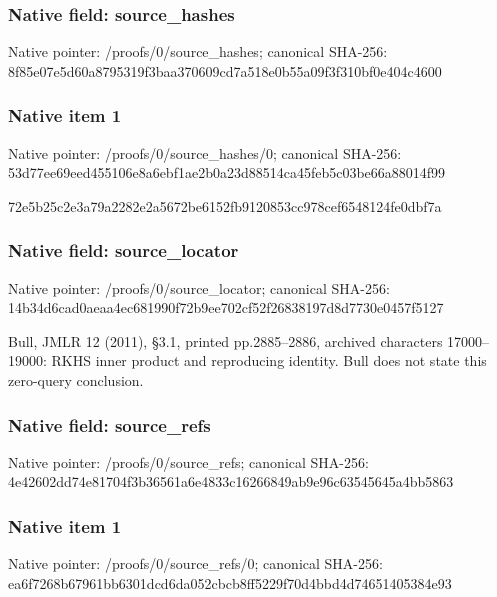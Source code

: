 \documentclass[10pt,a4paper]{article}
\begin{document}
\subsubsection{Native field: source\_\allowbreak{}hashes}
Native pointer: /proofs/0/source\_\allowbreak{}hashes; canonical SHA-256: 8f85e07e5d60a8795319f3baa370609cd7a518e0b55a09f3f310bf0e404c4600

\subsubsection{Native item 1}
Native pointer: /proofs/0/source\_\allowbreak{}hashes/0; canonical SHA-256: 53d77ee69eed455106e8a6ebf1ae2b0a23d88514ca45feb5c03be66a88014f99

\begingroup\raggedright\sloppy 72e5b25c2e3a79a2282e2a5672be6152fb9120853cc978cef6548124fe0dbf7a\par\endgroup

\subsubsection{Native field: source\_\allowbreak{}locator}
Native pointer: /proofs/0/source\_\allowbreak{}locator; canonical SHA-256: 14b34d6cad0aeaa4ec681990f72b9ee702cf52f26838197d8d7730e0457f5127

\begingroup\raggedright\sloppy Bull,\allowbreak{} JMLR 12 (2011),\allowbreak{} {\AtlasUnicodeText §}\allowbreak{}3.1,\allowbreak{} printed pp.2885{\AtlasUnicodeText –}\allowbreak{}2886,\allowbreak{} archived characters 17000{\AtlasUnicodeText –}\allowbreak{}19000:\allowbreak{} RKHS inner product and reproducing identity. Bull does not state this zero-query conclusion.\par\endgroup

\subsubsection{Native field: source\_\allowbreak{}refs}
Native pointer: /proofs/0/source\_\allowbreak{}refs; canonical SHA-256: 4e42602dd74e81704f3b36561a6e4833c16266849ab9e96c63545645a4bb5863

\subsubsection{Native item 1}
Native pointer: /proofs/0/source\_\allowbreak{}refs/0; canonical SHA-256: ea6f7268b67961bb6301dcd6da052cbcb8ff5229f70d4bbd4d74651405384e93
\end{document}
